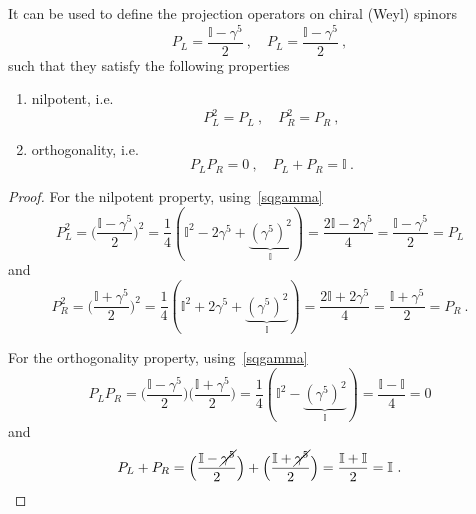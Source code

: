     It can be used to define the projection operators on chiral (Weyl) spinors
    \begin{equation*}
        P_L = \frac{\mathbb I - \gamma^5}{2} ~, \quad P_L = \frac{\mathbb I - \gamma^5}{2} ~,
    \end{equation*}
    such that they satisfy the following properties 
    \begin{enumerate}
        \item nilpotent, i.e. 
            \begin{equation*}
                P_L^2 = P_L ~, \quad P_R^2 = P_R ~,
            \end{equation*}
        \item orthogonality, i.e. 
            \begin{equation*}
                P_L P_R = 0 ~, \quad P_L + P_R = \mathbb I~.
            \end{equation*}
    \end{enumerate}
    \begin{proof}
        For the nilpotent property, using~\eqref{sqgamma}
        \begin{equation*}
            P_L^2 = \Big ( \frac{\mathbb I - \gamma^5}{2} \Big)^2 = \frac{1}{4} (\mathbb I^2 - 2 \gamma^5 + \underbrace{(\gamma^5)^2}_{\mathbb I} ) = \frac{2 \mathbb I - 2 \gamma^5}{4} = \frac{\mathbb I - \gamma^5}{2} = P_L
        \end{equation*}
        and 
        \begin{equation*}
            P_R^2 = \Big ( \frac{\mathbb I + \gamma^5}{2} \Big)^2 = \frac{1}{4} (\mathbb I^2 + 2 \gamma^5 + \underbrace{(\gamma^5)^2}_{\mathbb I} ) = \frac{2 \mathbb I + 2 \gamma^5}{4} = \frac{\mathbb I + \gamma^5}{2} = P_R ~.
        \end{equation*}

        For the orthogonality property, using~\eqref{sqgamma}
        \begin{equation*}
            P_L P_R = \Big ( \frac{\mathbb I - \gamma^5}{2} \Big)  \Big ( \frac{\mathbb I + \gamma^5}{2} \Big) = \frac{1}{4} (\mathbb I^2 - \underbrace{(\gamma^5)^2}_{\mathbb I} ) = \frac{\mathbb I - \mathbb I}{4} = 0
        \end{equation*}
        and
        \begin{equation*}
            P_L + P_R = \Big ( \frac{\mathbb I - \cancel{\gamma^5}}{2} \Big) + \Big ( \frac{\mathbb I + \cancel{\gamma^5}}{2} \Big) = \frac{\mathbb I + \mathbb I}{2} = \mathbb I ~.
        \end{equation*}
    \end{proof}
